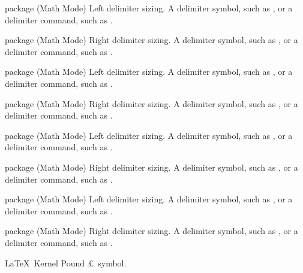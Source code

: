 %
 {}%
 { package (Math Mode)}%
 {Left delimiter sizing.}%
 {%
   \BeginArgList
     A delimiter symbol, such as
    , or a delimiter command, such as .
   \EndArgList
 }

%
 {}%
 { package (Math Mode)}%
 {Right delimiter sizing.}%
 {%
   \BeginArgList
     A delimiter symbol, such as
    , or a delimiter command, such as .
   \EndArgList
 }

%
 {}%
 { package (Math Mode)}%
 {Left delimiter sizing.}%
 {%
   \BeginArgList
     A delimiter symbol, such as
    , or a delimiter command, such as .
   \EndArgList
 }

%
 {}%
 { package (Math Mode)}%
 {Right delimiter sizing.}%
 {%
   \BeginArgList
     A delimiter symbol, such as
    , or a delimiter command, such as .
   \EndArgList
 }

%
 {}%
 { package (Math Mode)}%
 {Left delimiter sizing.}%
 {%
   \BeginArgList
     A delimiter symbol, such as
    , or a delimiter command, such as .
   \EndArgList
 }

%
 {}%
 { package (Math Mode)}%
 {Right delimiter sizing.}%
 {%
   \BeginArgList
     A delimiter symbol, such as
    , or a delimiter command, such as .
   \EndArgList
 }

%
 {}%
 { package (Math Mode)}%
 {Left delimiter sizing.}%
 {%
   \BeginArgList
     A delimiter symbol, such as
    , or a delimiter command, such as .
   \EndArgList
 }

%
 {}%
 { package (Math Mode)}%
 {Right delimiter sizing.}%
 {%
   \BeginArgList
     A delimiter symbol, such as
    , or a delimiter command, such as .
   \EndArgList
 }

%
 {}%
 {\LaTeX\ Kernel}%
 {Pound \pounds\ symbol.}%
 {}%


